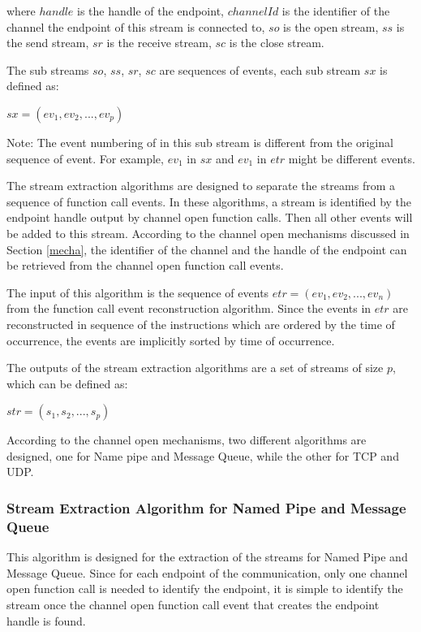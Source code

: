 where $handle$ is the handle of the endpoint, $channelId$ is the identifier of the channel the endpoint of this stream is connected to, $so$ is the open stream, $ss$ is the send stream, $sr$ is the receive stream, $sc$ is the close stream. 

The sub streams $so$, $ss$, $sr$, $sc$ are sequences of events, each sub stream $sx$ is defined as:

$sx = (ev_1, ev_2, ..., ev_p)$

Note: The event numbering of in this sub stream is different from the original sequence of event. For example, $ev_1$ in $sx$ and $ev_1$ in $etr$ might be different events.

The stream extraction algorithms are designed to separate the streams from a sequence of function call events. In these algorithms, a stream is identified by the endpoint handle output by channel open function calls. Then all other events will be added to this stream.  According to the channel open mechanisms discussed in Section \ref{mecha}, the identifier of the channel and the handle of the endpoint can be retrieved from the channel open function call events.

The input of this algorithm is the sequence of events $etr = (ev_1, ev_2, ..., ev_n)$ from the function call event reconstruction algorithm. Since the events in $etr$ are reconstructed in sequence of the instructions which are ordered by the time of occurrence, the events are implicitly sorted by time of occurrence. 

The outputs of the stream extraction algorithms are a set of streams of size $p$, which can be defined as:

$str = (s_1, s_2, ..., s_p)$

According to the channel open mechanisms, two different algorithms are designed, one for Name pipe and Message Queue, while the other for TCP and UDP. 

\subsubsection{Stream Extraction Algorithm for Named Pipe and Message Queue}
This algorithm is designed for the extraction of the streams for Named Pipe and Message Queue. Since for each endpoint of the communication, only one channel open function call is needed to identify the endpoint, it is simple to identify the stream once the channel open function call event that creates the endpoint handle is found. 

